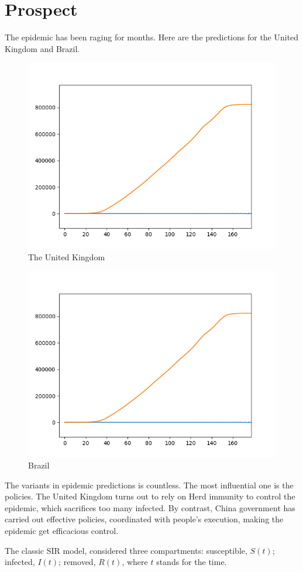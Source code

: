 \documentclass[]{article}
\begin{document}
\section{Prospect}
The epidemic has been raging for months. Here are the predictions for the United Kingdom and Brazil.
\begin{figure}[H]
	\centering
	\includegraphics[width=0.7\linewidth]{Figure_England}
	\caption{The United Kingdom}
	\label{fig:figure3}
\end{figure}
\begin{figure}[H]
	\centering
	\includegraphics[width=0.7\linewidth]{Figure_England}
	\caption{Brazil}
	\label{fig:figure4}
\end{figure}
The variants in epidemic predictions is countless. The most influential one is the policies. The United Kingdom turns out to rely on Herd immunity to control the epidemic, which sacrifices too many infected. By contrast, China government has carried out effective policies, coordinated with people's execution, making the epidemic get efficacious control.
\par
The classic SIR model\cite{kermack1927a}, considered three compartments: susceptible, $S(t)$; infected, $I(t)$; removed, $R(t)$, where $t$ stands for the time. 
\end{document}
